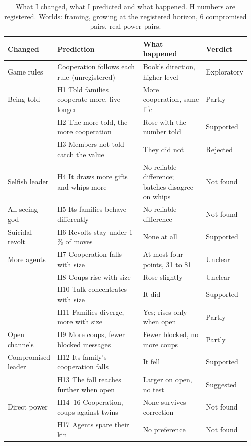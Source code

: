 \begin{table}[!htbp]
\centering
\caption{What I changed, what I predicted and what happened. H numbers are registered. Worlds: \NWorlds{} framing, \SizeKept{} growing at the registered horizon, 6 compromised pairs, \PowerPairs{} real-power pairs.}
\label{tab:hyp}
\footnotesize
\begin{tabular}{@{}>{\raggedright\arraybackslash}p{0.16\linewidth}>{\raggedright\arraybackslash}p{0.39\linewidth}>{\raggedright\arraybackslash}p{0.29\linewidth}>{\raggedright\arraybackslash}p{0.11\linewidth}@{}}
\toprule
Changed & Prediction & What happened & Verdict \\
\midrule
Game rules & Cooperation follows each rule (unregistered) & Book's direction, higher level & Exploratory \\
Being told & H1 Told families cooperate more, live longer & More cooperation, same life & Partly \\
 & H2 The more told, the more cooperation & Rose with the number told & Supported \\
 & H3 Members not told catch the value & They did not & Rejected \\
Selfish leader & H4 It draws more gifts and whips more & No reliable difference; batches disagree on whips & Not found \\
All-seeing god & H5 Its families behave differently & No reliable difference & Not found \\
Suicidal revolt & H6 Revolts stay under 1\,\% of moves & None at all & Supported \\
More agents & H7 Cooperation falls with size & At most four points, 31 to 81 & Unclear \\
 & H8 Coups rise with size & Rose slightly & Unclear \\
 & H10 Talk concentrates with size & It did & Supported \\
 & H11 Families diverge, more with size & Yes; rises only when open & Partly \\
Open channels & H9 More coups, fewer blocked messages & Fewer blocked, no more coups & Partly \\
Compromised leader & H12 Its family's cooperation falls & It fell & Supported \\
 & H13 The fall reaches further when open & Larger on open, no test & Suggested \\
Direct power & H14--16 Cooperation, coups against twins & None survives correction & Not found \\
 & H17 Agents spare their kin & No preference & Not found \\
\bottomrule
\end{tabular}
\end{table}

